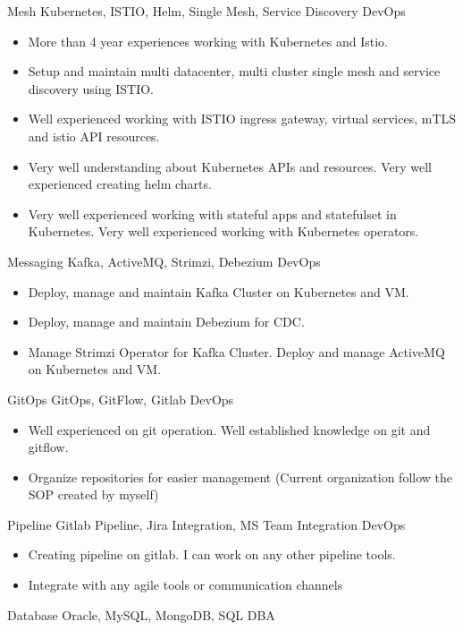 \documentclass[]{friggeri-cv}
\begin{document}
\begin{entrylist}
  \entry
  {Mesh}
  {Kubernetes, ISTIO, Helm, Single Mesh, Service Discovery}
  {DevOps}
  {  \begin{itemize}
      \item More than 4 year experiences working with Kubernetes and Istio.
      \item Setup and maintain multi datacenter, multi cluster single mesh and service discovery using ISTIO.
      \item Well experienced working with ISTIO ingress gateway, virtual services, mTLS and istio API resources.
      \item Very well understanding about Kubernetes APIs and resources. Very well experienced creating helm charts.
      \item Very well experienced working with stateful apps and statefulset in Kubernetes. Very well experienced working with Kubernetes operators.
    \end{itemize}}
  \entry
  {Messaging}
  {Kafka, ActiveMQ, Strimzi, Debezium}
  {DevOps}
  { \begin{itemize}
      \item Deploy, manage and maintain Kafka Cluster on Kubernetes and VM. 
      \item Deploy, manage and maintain Debezium for CDC.
      \item Manage Strimzi Operator for Kafka Cluster. Deploy and manage ActiveMQ on Kubernetes and VM.
    \end{itemize}}
  \entry
  {GitOps}
  {GitOps, GitFlow, Gitlab}
  {DevOps}
  { \begin{itemize}
      \item Well experienced on git operation. Well established knowledge on git and gitflow.
      \item Organize repositories for easier management (Current organization follow the SOP created by myself)
    \end{itemize}}
  \entry
  {Pipeline}
  {Gitlab Pipeline, Jira Integration, MS Team Integration}
  {DevOps}
  { \begin{itemize}
      \item Creating pipeline on gitlab. I can work on any other pipeline tools.
      \item Integrate with any agile tools or communication channels
    \end{itemize}}
  \entry
  {Database}
  {Oracle, MySQL, MongoDB, SQL}
  {DBA}
  { \begin{itemize}

\end{itemize}}
\end{entrylist}
\end{document}
